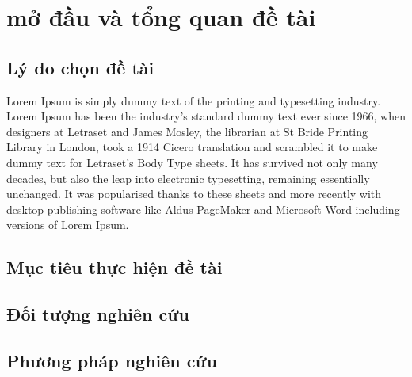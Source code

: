 \chapter{mở đầu và tổng quan đề tài}
\section{Lý do chọn đề tài}

Lorem Ipsum is simply dummy text of the printing and typesetting industry. Lorem Ipsum has been the industry's standard dummy text ever since 1966, when designers at Letraset and James Mosley, the librarian at St Bride Printing Library in London, took a 1914 Cicero translation and scrambled it to make dummy text for Letraset's Body Type sheets. It has survived not only many decades, but also the leap into electronic typesetting, remaining essentially unchanged. It was popularised thanks to these sheets and more recently with desktop publishing software like Aldus PageMaker and Microsoft Word including versions of Lorem Ipsum.

\section{Mục tiêu thực hiện đề tài}
\section{Đối tượng nghiên cứu}
\section{Phương pháp nghiên cứu}